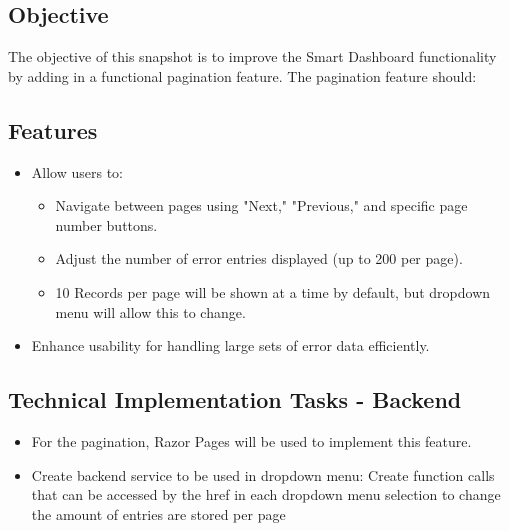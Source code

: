 \documentclass[12pt]{article}
\begin{document}
\subsection*{Objective}
The objective of this snapshot is to improve the Smart Dashboard functionality by adding in a functional pagination feature.
The pagination feature should:


\subsection*{Features}
\begin{itemize}
    \item Allow users to:
    \begin{itemize}
        \item Navigate between pages using "Next," "Previous," and specific page number buttons.
        \item Adjust the number of error entries displayed (up to 200 per page).
        \item 10 Records per page will be shown at a time by default, but dropdown menu will allow this to change.
    \end{itemize}
    \item Enhance usability for handling large sets of error data efficiently.
\end{itemize}

\subsection*{Technical Implementation Tasks - Backend}
\begin{itemize}
    \item For the pagination, Razor Pages will be used to implement this feature.
    \item Create backend service to be used in dropdown menu: Create function calls that can be accessed by the href in each dropdown menu selection to change the amount of entries are stored per page
\end{itemize}
\end{document}
